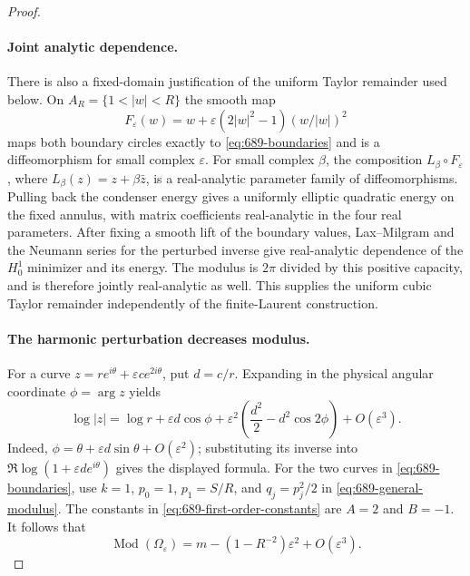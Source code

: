 \documentclass[11pt,a4paper]{article}
\theoremstyle{remark}
\begin{document}
\begin{proof}
\paragraph{Joint analytic dependence.}
There is also a fixed-domain justification of the uniform Taylor remainder used below. On $A_R=\{1<|w|<R\}$ the smooth map
\[
F_\varepsilon(w)=w+\varepsilon(2|w|^2-1)(w/|w|)^2
\]
maps both boundary circles exactly to \eqref{eq:689-boundaries} and is a diffeomorphism for small complex $\varepsilon$. For small complex $\beta$, the composition $L_\beta\circ F_\varepsilon$, where $L_\beta(z)=z+\beta\bar z$, is a real-analytic parameter family of diffeomorphisms. Pulling back the condenser energy gives a uniformly elliptic quadratic energy on the fixed annulus, with matrix coefficients real-analytic in the four real parameters. After fixing a smooth lift of the boundary values, Lax--Milgram and the Neumann series for the perturbed inverse give real-analytic dependence of the $H^1_0$ minimizer and its energy. The modulus is $2\pi$ divided by this positive capacity, and is therefore jointly real-analytic as well. This supplies the uniform cubic Taylor remainder independently of the finite-Laurent construction.

\paragraph{The harmonic perturbation decreases modulus.}
For a curve $z=r e^{i\theta}+\varepsilon c e^{2i\theta}$, put $d=c/r$. Expanding in the physical angular coordinate $\phi=\arg z$ yields
\begin{equation}
 \log|z|=\log r+\varepsilon d\cos\phi
    +\varepsilon^2\left(\frac{d^2}{2}-d^2\cos2\phi\right)
    +O(\varepsilon^3).
 \label{eq:689-harmonic-boundary-expansion}
\end{equation}
Indeed, $\phi=\theta+\varepsilon d\sin\theta+O(\varepsilon^2)$; substituting its inverse into $\Re\log(1+\varepsilon d e^{i\theta})$ gives the displayed formula. For the two curves in \eqref{eq:689-boundaries}, use $k=1$, $p_0=1$, $p_1=S/R$, and $q_j=p_j^2/2$ in \eqref{eq:689-general-modulus}. The constants in \eqref{eq:689-first-order-constants} are $A=2$ and $B=-1$. It follows that
\begin{equation}
 \operatorname{Mod}(\Omega_\varepsilon)
 =m-\left(1-R^{-2}\right)\varepsilon^2+O(\varepsilon^3).
 \label{eq:689-ordinary-modulus}
\end{equation}


\end{proof}
\end{document}
